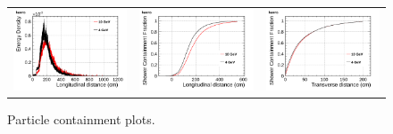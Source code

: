 \begin{figure}[htp]
\begin{tabular}{ccc}
 
    \includegraphics[scale=0.15]{figures/kaons_density_overlay}&
    \includegraphics[scale=0.15]{figures/kaons_lcont_overlay}&
    \includegraphics[scale=0.15]{figures/kaons_wcont_overlay}\\
 
  \end{tabular}
  \caption{Particle containment plots.}
\end{figure}

